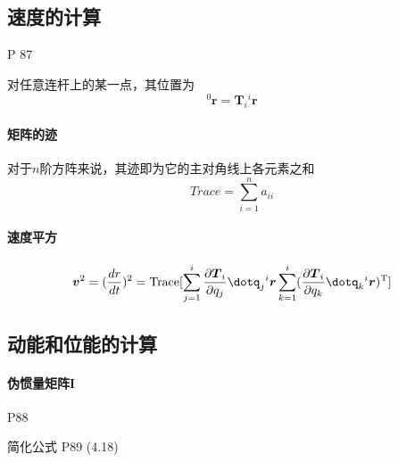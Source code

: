 \documentclass[11pt]{book}
\begin{document}
\subsection{速度的计算}

P 87

对任意连杆上的某一点，其位置为
\begin{equation}
	{}^0 \boldsymbol{r} = \boldsymbol{T}_i {}^i \boldsymbol{r}
\end{equation}



\paragraph{矩阵的迹}%
\label{par:ju_zhen_de_ji_}

对于$n$阶方阵来说，其迹即为它的主对角线上各元素之和
$$
Trace = \sum^{n}_{i=1} a_{ii}
$$

\paragraph{速度平方}%
\label{par:su_du_ping_fang_}

\begin{equation}
	\boldsymbol{v}^2 = ( \frac{dr}{dt} )^2 = \text{Trace}[ \sum^{i}_{j=1} \frac{\partial \boldsymbol{T}_i}{\partial q_j} \dotq_j {}^i \boldsymbol{r} \sum^{i}_{k=1} ( \frac{\partial \boldsymbol{T}_i}{\partial q_k} \dotq_k {}^i \boldsymbol{r})^\text{T}]
\end{equation}

\subsection{动能和位能的计算}

\paragraph{伪惯量矩阵$ \boldsymbol{I} $}%
\label{par:wei_guan_liang_ju_zhen_mbsi_}

P88

简化公式 P89 (4.18)
\end{document}
